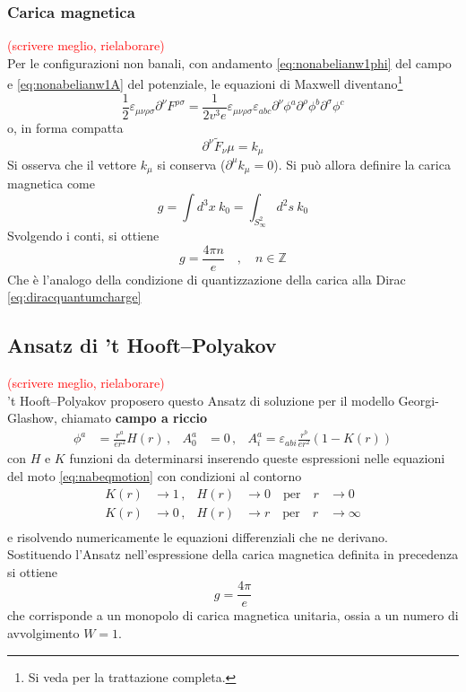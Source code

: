 \subsubsection{Carica magnetica}
\textcolor{red}{(scrivere meglio, rielaborare)}\\
Per le configurazioni non banali, con andamento \ref{eq:nonabelianw1phi} del campo
e \ref{eq:nonabelianw1A} del potenziale, le equazioni di Maxwell diventano\footnote{
   Si veda \cite{nakahara} per la trattazione completa.
}
$$
   \frac{1}{2} \varepsilon_{\mu\nu\rho\sigma} \partial ^\nu F^{\rho\sigma} =
       \frac{1}{2 v^3 e} \varepsilon_{\mu\nu\rho\sigma}\varepsilon_{abc}
       \partial^\nu \phi^a \partial^\rho \phi^b \partial^\sigma \phi^c
$$
o, in forma compatta
$$
   \partial ^\nu \tilde{F}_\nu\mu = k_\mu
$$
Si osserva che il vettore $k_\mu$ si conserva ($\partial ^\mu k_\mu = 0$).
Si può allora definire la carica magnetica come
$$
   g = \int d^3 x \: k_0 = \int_{S^2_\infty} d^2s \: k_0
$$
Svolgendo i conti, si ottiene
\begin{equation}\label{eq:nonabelianquantumcharge}
   g = \frac{4\pi n}{e} \quad,\quad n \in \mathbb{Z}
\end{equation}
Che è l'analogo della condizione di quantizzazione della carica alla Dirac
\ref{eq:diracquantumcharge}

\subsection{Ansatz di ’t Hooft–Polyakov}
\textcolor{red}{(scrivere meglio, rielaborare)}\\
’t Hooft–Polyakov proposero questo Ansatz di soluzione per il modello Georgi-Glashow,
chiamato \textbf{campo a riccio}
\begin{equation}
   \begin{aligned}
      \phi^a & = \frac{r^a}{er^2}H(r) \, ,&
      A_0^a & = 0 \, ,&
      A_i^a = \varepsilon_{abi}\frac{r^b}{er^2}(1-K(r))
   \end{aligned}
\end{equation}
con $H$ e $K$ funzioni da determinarsi inserendo queste espressioni nelle equazioni
del moto \ref{eq:nabeqmotion} con condizioni al contorno
\begin{equation}
   \begin{aligned}
      K(r) &\to 1 \, ,& H(r) &\to 0 \quad \mathrm{per} \quad r & \to 0 \\
      K(r) &\to 0 \, ,& H(r) &\to r \quad \mathrm{per} \quad r & \to \infty \\
   \end{aligned}
\end{equation}
e risolvendo numericamente le equazioni differenziali che ne derivano.\\

Sostituendo l'Ansatz nell'espressione della carica magnetica definita in precedenza
si ottiene
\begin{equation}
   g = \frac{4\pi}{e}
\end{equation}
che corrisponde a un monopolo di carica magnetica unitaria, ossia a un
numero di avvolgimento $W = 1$.\\
